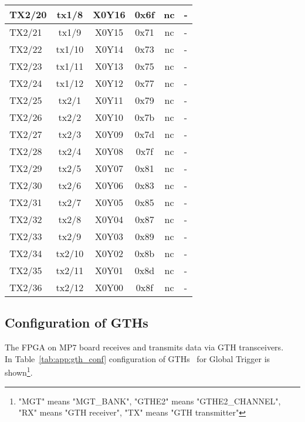 \begin{longtable}{|l|c|c|c|c|l|}
TX2/20 & tx1/8  & X0Y16 & 0x6f & nc & -\\\hline
TX2/21 & tx1/9  & X0Y15 & 0x71 & nc & -\\\hline
TX2/22 & tx1/10 & X0Y14 & 0x73 & nc & -\\\hline
TX2/23 & tx1/11 & X0Y13 & 0x75 & nc & -\\\hline
TX2/24 & tx1/12 & X0Y12 & 0x77 & nc & -\\\hline
TX2/25 & tx2/1  & X0Y11 & 0x79 & nc & -\\\hline
TX2/26 & tx2/2  & X0Y10 & 0x7b & nc & -\\\hline
TX2/27 & tx2/3  & X0Y09 & 0x7d & nc & -\\\hline
TX2/28 & tx2/4  & X0Y08 & 0x7f & nc & -\\\hline
TX2/29 & tx2/5  & X0Y07 & 0x81 & nc & -\\\hline
TX2/30 & tx2/6  & X0Y06 & 0x83 & nc & -\\\hline
TX2/31 & tx2/7  & X0Y05 & 0x85 & nc & -\\\hline
TX2/32 & tx2/8  & X0Y04 & 0x87 & nc & -\\\hline
TX2/33 & tx2/9  & X0Y03 & 0x89 & nc & -\\\hline
TX2/34 & tx2/10 & X0Y02 & 0x8b & nc & -\\\hline
TX2/35 & tx2/11 & X0Y01 & 0x8d & nc & -\\\hline
TX2/36 & tx2/12 & X0Y00 & 0x8f & nc & -\\\hline
\end{longtable}

\clearpage

\subsection{Configuration of GTHs}\label{sec:app:gth_conf_table}

The FPGA on MP7 board receives and transmits data via GTH transceivers.\\
In Table~\ref{tab:app:gth_conf} configuration of GTHs~\cite{GTHs} for Global Trigger is shown\footnote{"MGT" means "MGT\_BANK", "GTHE2" means "GTHE2\_CHANNEL", "RX" means "GTH receiver", "TX" means "GTH transmitter"}.

